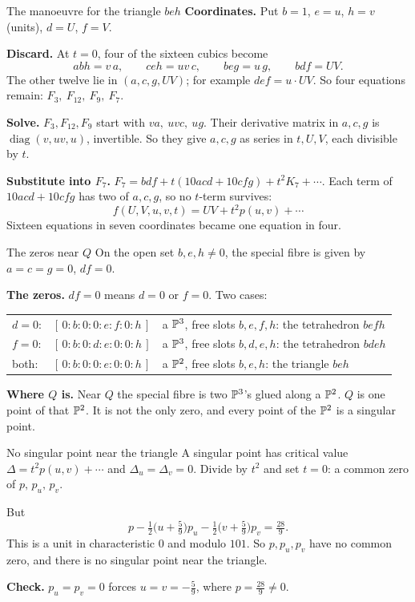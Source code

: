 \begin{frame}{The manoeuvre for the triangle \(beh\)}
\textbf{Coordinates.} Put \(b=1\), \(e=u\), \(h=v\) (units), \(d=U\), \(f=V\).
\par\medskip
\textbf{Discard.} At \(t=0\), four of the sixteen cubics become
\[
abh=v\,a,\qquad ceh=uv\,c,\qquad beg=u\,g,\qquad bdf=UV.
\]
The other twelve lie in \((a,c,g,UV)\); for example \(def=u\cdot UV\). So four equations remain: \(F_3,\ F_{12},\ F_9,\ F_7\).
\par\medskip
\textbf{Solve.} \(F_3,F_{12},F_9\) start with \(va,\ uvc,\ ug\). Their derivative matrix in \(a,c,g\) is \(\operatorname{diag}(v,uv,u)\), invertible. So they give \(a,c,g\) as series in \(t,U,V\), each divisible by \(t\).
\par\medskip
\textbf{Substitute into \(F_7\).} \(F_7=bdf+t(10acd+10cfg)+t^2K_7+\cdots\). Each term of \(10acd+10cfg\) has two of \(a,c,g\), so no \(t\)-term survives:
\[
\boxed{f(U,V,u,v,t)=UV+t^2p(u,v)+\cdots}
\]
Sixteen equations in seven coordinates became one equation in four.
\end{frame}
\begin{frame}{The zeros near \(Q\)}
On the open set \(b,e,h\ne0\), the special fibre is given by \(a=c=g=0\), \(df=0\).
\par\medskip
\textbf{The zeros.} \(df=0\) means \(d=0\) or \(f=0\). Two cases:
\begin{center}
\begin{tabular}{lll}
\(d=0\):&\([\,0:b:0:0:e:f:0:h\,]\)&a \(\mathbb P^3\), free slots \(b,e,f,h\): the tetrahedron \(befh\)\\[3pt]
\(f=0\):&\([\,0:b:0:d:e:0:0:h\,]\)&a \(\mathbb P^3\), free slots \(b,d,e,h\): the tetrahedron \(bdeh\)\\[3pt]
both:&\([\,0:b:0:0:e:0:0:h\,]\)&a \(\mathbb P^2\), free slots \(b,e,h\): the triangle \(beh\)
\end{tabular}
\end{center}
\textbf{Where \(Q\) is.} Near \(Q\) the special fibre is two \(\mathbb P^3\)'s glued along a \(\mathbb P^2\). \(Q\) is one point of that \(\mathbb P^2\). It is not the only zero, and every point of the \(\mathbb P^2\) is a singular point.
\end{frame}
\fi


\begin{frame}{No singular point near the triangle}
A singular point has critical value \(\Delta=t^2p(u,v)+\cdots\) and \(\Delta_u=\Delta_v=0\). Divide by \(t^2\) and set \(t=0\): a common zero of \(p,\,p_u,\,p_v\).
\par\medskip
But
\[
\boxed{p-\tfrac12\bigl(u+\tfrac59\bigr)p_u-\tfrac12\bigl(v+\tfrac59\bigr)p_v=\tfrac{28}{9}.}
\]
This is a unit in characteristic \(0\) and modulo \(101\). So \(p,p_u,p_v\) have no common zero, and there is no singular point near the triangle.
\par\medskip
\textbf{Check.} \(p_u=p_v=0\) forces \(u=v=-\tfrac59\), where \(p=\tfrac{28}{9}\ne0\).
\end{frame}

